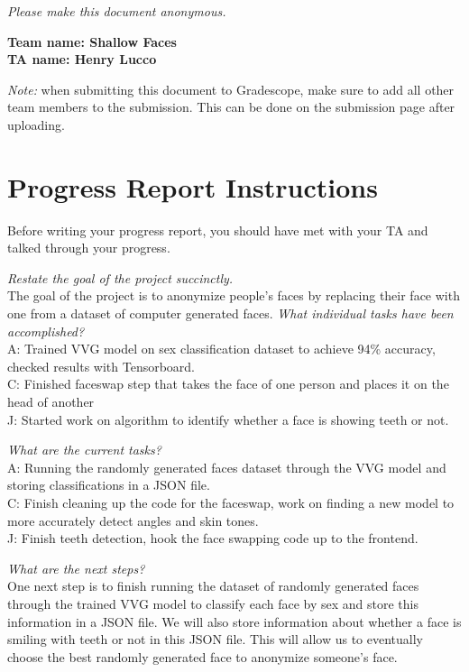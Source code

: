 \emph{Please make this document anonymous.}

\textbf{Team name: Shallow Faces}\\
\textbf{TA name: Henry Lucco}

\emph{Note:} when submitting this document to Gradescope, make sure to add all other team members to the submission. This can be done on the submission page after uploading.

\section*{Progress Report Instructions}

Before writing your progress report, you should have met with your TA and talked through your progress.

%
\textit{Restate the goal of the project succinctly.}\\
The goal of the project is to anonymize people's faces by replacing their face with one from a dataset of computer generated faces.
%
%
\textit{What individual tasks have been accomplished?}\\
A: Trained VVG model on sex classification dataset to achieve 94\% accuracy, checked results with Tensorboard.\\
C: Finished faceswap step that takes the face of one person and places it on the head of another\\
J: Started work on algorithm to identify whether a face is showing teeth or not.

%
\textit{What are the current tasks?}\\
A: Running the randomly generated faces dataset through the VVG model and storing classifications in a JSON file.\\
C: Finish cleaning up the code for the faceswap, work on finding a new model to more accurately detect angles and skin tones.\\
J: Finish teeth detection, hook the face swapping code up to the frontend.

%
%
\textit{What are the next steps?}\\
One next step is to finish running the dataset of randomly generated faces through the trained VVG model to classify each face by sex and store this information in a JSON file. We will also store information about whether a face is smiling with teeth or not in this JSON file. This will allow us to eventually choose the best randomly generated face to anonymize someone's face.
%


